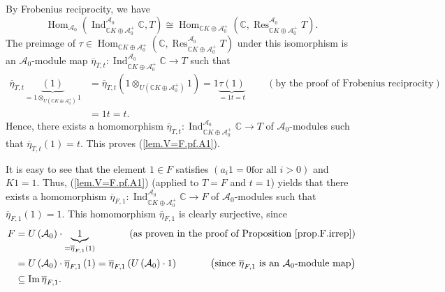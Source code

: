 \documentclass
[numbers=enddot,12pt,final,onecolumn,german,notitlepage]{scrartcl}%
\theoremstyle{definition}
\begin{document}
By Frobenius reciprocity, we have%
\[
\operatorname*{Hom}\nolimits_{\mathcal{A}_{0}}\left(  \operatorname*{Ind}%
\nolimits_{\mathbb{C}K\oplus\mathcal{A}_{0}^{+}}^{\mathcal{A}_{0}}%
\mathbb{C},T\right)  \cong\operatorname*{Hom}\nolimits_{\mathbb{C}%
K\oplus\mathcal{A}_{0}^{+}}\left(  \mathbb{C},\operatorname*{Res}%
\nolimits_{\mathbb{C}K\oplus\mathcal{A}_{0}^{+}}^{\mathcal{A}_{0}}T\right)  .
\]
The preimage of $\tau\in\operatorname*{Hom}\nolimits_{\mathbb{C}%
K\oplus\mathcal{A}_{0}^{+}}\left(  \mathbb{C},\operatorname*{Res}%
\nolimits_{\mathbb{C}K\oplus\mathcal{A}_{0}^{+}}^{\mathcal{A}_{0}}T\right)  $
under this isomorphism is an $\mathcal{A}_{0}$-module map $\overline{\eta
}_{T,t}:\operatorname*{Ind}\nolimits_{\mathbb{C}K\oplus\mathcal{A}_{0}^{+}%
}^{\mathcal{A}_{0}}\mathbb{C}\rightarrow T$ such that
\begin{align*}
\overline{\eta}_{T,t}\underbrace{\left(  1\right)  }_{=1\otimes_{U\left(
\mathbb{C}K\oplus\mathcal{A}_{0}^{+}\right)  }1}  &  =\overline{\eta}%
_{T,t}\left(  1\otimes_{U\left(  \mathbb{C}K\oplus\mathcal{A}_{0}^{+}\right)
}1\right)  =1\underbrace{\tau\left(  1\right)  }_{=1t=t}%
\ \ \ \ \ \ \ \ \ \ \left(  \text{by the proof of Frobenius reciprocity}%
\right) \\
&  =1t=t.
\end{align*}
Hence, there exists a homomorphism $\overline{\eta}_{T,t}:\operatorname*{Ind}%
\nolimits_{\mathbb{C}K\oplus\mathcal{A}_{0}^{+}}^{\mathcal{A}_{0}}%
\mathbb{C}\rightarrow T$ of $\mathcal{A}_{0}$-modules such that $\overline
{\eta}_{T,t}\left(  1\right)  =t$. This proves (\ref{lem.V=F.pf.A1}).

It is easy to see that the element $1\in F$ satisfies $\left(  a_{i}1=0\text{
for all }i>0\right)  $ and $K1=1$. Thus, (\ref{lem.V=F.pf.A1}) (applied to
$T=F$ and $t=1$) yields that there exists a homomorphism $\overline{\eta
}_{F,1}:\operatorname*{Ind}\nolimits_{\mathbb{C}K\oplus\mathcal{A}_{0}^{+}%
}^{\mathcal{A}_{0}}\mathbb{C}\rightarrow F$ of $\mathcal{A}_{0}$-modules such
that $\overline{\eta}_{F,1}\left(  1\right)  =1$. This homomorphism
$\overline{\eta}_{F,1}$ is clearly surjective, since
\begin{align*}
F  &  =U\left(  \mathcal{A}_{0}\right)  \cdot\underbrace{1}_{=\overline{\eta
}_{F,1}\left(  1\right)  }\ \ \ \ \ \ \ \ \ \ \left(  \text{as proven in the
proof of Proposition \ref{prop.F.irrep}}\right) \\
&  =U\left(  \mathcal{A}_{0}\right)  \cdot\overline{\eta}_{F,1}\left(
1\right)  =\overline{\eta}_{F,1}\left(  U\left(  \mathcal{A}_{0}\right)
\cdot1\right)  \ \ \ \ \ \ \ \ \ \ \left(  \text{since }\overline{\eta}%
_{F,1}\text{ is an }\mathcal{A}_{0}\text{-module map}\right) \\
&  \subseteq\operatorname{Im}\overline{\eta}_{F,1}.
\end{align*}
\end{document}
